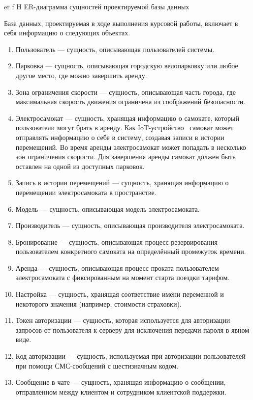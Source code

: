     {er}
    {f}
    {H}
    {\textwidth}
    {ER-диаграмма сущностей проектируемой базы данных}

База данных, проектируемая в ходе выполнения курсовой работы, включает в себя информацию о следующих объектах.

\begin{enumerate}
    \item Пользователь --- сущность, описывающая пользователей системы.
    \item Парковка --- сущность, описывающая городскую велопарковку или любое другое место, где можно завершить аренду.
    \item Зона ограничения скорости --- сущность, описывающая часть города, где максимальная скорость движения ограничена из соображений безопасности.
    \item Электросамокат --- сущность, хранящая информацию о самокате, который пользователи могут брать в аренду. Как IoT-устройство~\cite{iot} самокат может отправлять информацию о себе в систему, создавая записи в истории перемещений. Во время аренды электросамокат может попадать в несколько зон ограничения скорости. Для завершения аренды самокат должен быть оставлен на одной из доступных парковок.
    \item Запись в истории перемещений --- сущность, хранящая информацию о перемещении электросамоката в пространстве.
    \item Модель --- сущность, описывающая модель электросамоката.
    \item Производитель --- сущность, описывающая производителя электросамоката.
    \item Бронирование --- сущность, описывающая процесс резервирования пользователем конкретного самоката на определённый промежуток времени.
    \item Аренда --- сущность, описывающая процесс проката пользователем электросамоката с фиксированным на момент старта поездки тарифом.
    \item Настройка --- сущность, хранящая соответствие имени переменной и некоторого значения (например, стоимости страховки).
    \item Токен авторизации --- сущность, которая используется для авторизации запросов от пользователя к серверу для исключения передачи пароля в явном виде.
    \item Код авторизации --- сущность, используемая при авторизации пользователей при помощи СМС-сообщений с шестизначным кодом.
    \item Сообщение в чате --- сущность, хранящая информацию о сообщении, отправленном между клиентом и сотрудником клиентской поддержки.
\end{enumerate}

